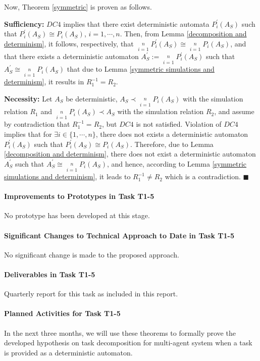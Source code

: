 Now, Theorem \ref{symmetric} is proven as follows.

\textbf{Sufficiency:} $DC4$ implies that there exist deterministic
automata $P_i^{\prime}(A_S)$ such that $P_i^{\prime}(A_S) \cong
P_i(A_S)$, $i = 1, \cdots, n$. Then, from Lemma
\ref{decomposition and determinism},
it follows, respectively, that $\mathop {||}\limits_{i = 1}^n
P_i^{\prime}(A_S)\cong \mathop {||}\limits_{i = 1}^n P_i(A_S)$, and
that there exists a deterministic automaton $A^{\prime}_S := \mathop
{||}\limits_{i = 1}^n P_i^{\prime}(A_S)$ such that $A^{\prime}_S
\cong \mathop {||}\limits_{i = 1}^n P_i(A_S)$ that due to Lemma
\ref{symmetric simulations and determinism}, it results in $R_1^{-1}
= R_2$.

\textbf{Necessity:} Let $A_S$ be deterministic, $A_S\prec \mathop
{||}\limits_{i = 1}^n P_i(A_S)$ with the simulation relation $R_1$
and $\mathop {||}\limits_{i = 1}^n P_i(A_S)\prec A_S$ with the
simulation relation $R_2$, and assume by contradiction that
$R_1^{-1} = R_2$, but $DC4$ is not satisfied. Violation of $DC4$
implies that for $\exists i \in \{1,\cdots, n\}$, there does not
exists a deterministic automaton $P_i^{\prime}(A_S)$ such that
$P_i^{\prime}(A_S) \cong P_i(A_S)$. Therefore, due to Lemma
\ref{decomposition and determinism}, there does not exist a
deterministic automaton $A^{\prime}_S$ such that $A^{\prime}_S \cong
\mathop {||}\limits_{i = 1}^n P_i(A_S)$, and hence, according to
Lemma \ref{symmetric simulations and determinism}, it leads to
$R_1^{-1} \neq R_2$ which is a contradiction.  $\blacksquare$




\paragraph{ Improvements to Prototypes in Task T1-5 }
No prototype has been developed at this stage.
\paragraph{ Significant Changes to Technical Approach to Date in Task T1-5 }
 No significant change is made to the proposed approach.

\paragraph{  Deliverables in Task T1-5 }
Quarterly report for this task as included in this report.


\paragraph{Planned Activities for Task T1-5} In the next three months, we will use these theorems to formally prove the developed hypothesis on task decomposition for multi-agent system
when a task is provided as a deterministic automaton.

